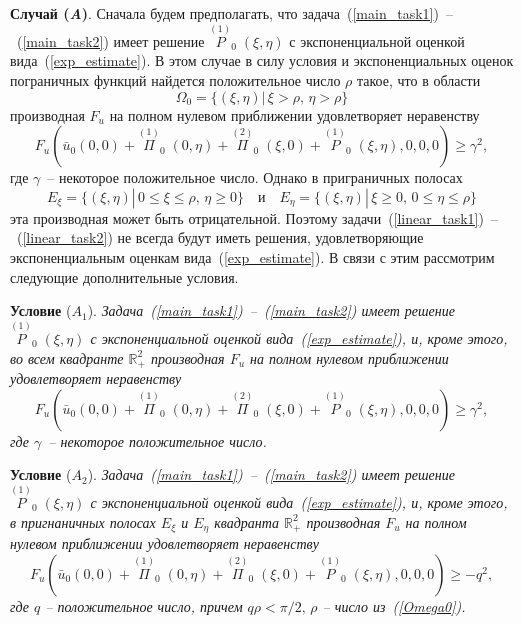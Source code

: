 \documentclass[12pt]{article}
\newcommand{\RNumb}[1]{\uppercase\expandafter{\romannumeral #1\relax}}
\begin{document}
{\bf Случай (\textit{A})}. Сначала будем предполагать, что задача~(\ref {main_task1})~--~(\ref {main_task2}) имеет решение $\overset{(1)}{P}_0 \; (\xi, \eta)$ с экспоненциальной оценкой вида~(\ref{exp_estimate}). В этом случае в силу условия \RNumb{3} и экспоненциальных оценок пограничных функций найдется положительное число $\rho$ такое, что в области
\begin{equation} \label {Omega0}
	\Omega_0 = \{ (\xi, \eta)| \, \xi > \rho, \, \eta > \rho \}
\end{equation}
производная $F_u$ на полном нулевом приближении удовлетворяет неравенству
\begin{equation*}
	F_u \left( \bar u_0(0, 0) + \overset{(1)}{\Pi}_0 \; (0, \eta) + \overset{(2)}{\Pi}_0 \; (\xi, 0) + \overset{(1)}{P}_0 \; (\xi, \eta), 0, 0, 0 \right) \ge \gamma^2, 
\end{equation*}
где $\gamma$~-- некоторое положительное число. Однако в приграничных полосах
\begin{equation*}
	E_{\xi} = \{ (\xi, \eta) | \, 0 \le \xi \le \rho, \, \eta \ge 0 \} \quad \text{и} \quad E_{\eta} = \{ (\xi, \eta) | \, \xi \ge 0, \, 0 \le \eta \le \rho \}
\end{equation*}
эта производная может быть отрицательной. Поэтому задачи~(\ref {linear_task1})~--~(\ref {linear_task2}) не всегда будут иметь решения, удовлетворяющие экспоненциальным оценкам вида~(\ref{exp_estimate}). В связи с этим рассмотрим следующие дополнительные условия.
 
{\bf Условие} (\textit{$A_1$}). 
\textit{Задача~(\ref {main_task1})~--~(\ref {main_task2}) имеет решение $\overset{(1)}{P}_0 \; (\xi, \eta)$ с экспоненциальной оценкой вида~(\ref{exp_estimate}), и, кроме этого, во всем квадранте $\mathbb{R}_+^2$ производная $F_u$ на полном нулевом приближении удовлетворяет неравенству
\begin{equation*}
	F_u \left( \bar u_0(0, 0) + \overset{(1)}{\Pi}_0 \; (0, \eta) + \overset{(2)}{\Pi}_0 \; (\xi, 0) + \overset{(1)}{P}_0 \; (\xi, \eta), 0, 0, 0 \right) \ge \gamma^2,
\end{equation*}
где $\gamma$~-- некоторое положительное число. }

{\bf Условие} (\textit{$A_2$}). 
\textit{Задача~(\ref {main_task1})~--~(\ref {main_task2}) имеет решение $\overset{(1)}{P}_0 \; (\xi, \eta)$ с экспоненциальной оценкой вида~(\ref{exp_estimate}), и, кроме этого, в пригнаничных полосах $E_{\xi}$ и $E_{\eta}$ квадранта $\mathbb{R}_+^2$ производная $F_u$ на полном нулевом приближении удовлетворяет неравенству
\begin{equation*}
	F_u \left( \bar u_0(0, 0) + \overset{(1)}{\Pi}_0 \; (0, \eta) + \overset{(2)}{\Pi}_0 \; (\xi, 0) + \overset{(1)}{P}_0 \; (\xi, \eta), 0, 0, 0 \right) \ge -q^2,
\end{equation*}
где $q$ -- положительное число, причем $q \rho < \pi / 2, \, \rho$ -- число из~(\ref{Omega0}). }
\end{document}
